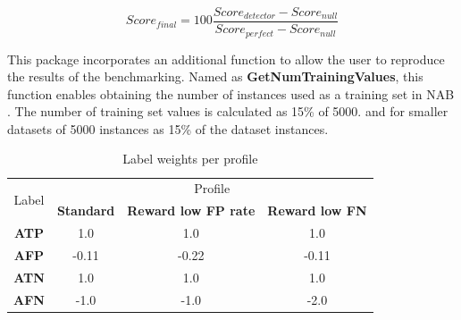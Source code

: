 \documentclass[a4paper]{article}\usepackage[]{graphicx}\usepackage[]{color}
\begin{document}
\begin{equation}\label{eq:eq1}
Score_{final} = 100 \frac{Score_{detector} - Score_{null}}{Score_{perfect} - Score_{null}}
\end{equation}

This package incorporates an additional function to allow the user to reproduce the results of the benchmarking. Named as \textbf{GetNumTrainingValues}, this function enables obtaining the number of instances used as a training set in NAB \cite{7424283}. The number of training set values is calculated as 15\% of 5000. and for smaller datasets of 5000 instances as 15\% of the dataset instances.


\begin{table}[]
\caption{Label weights per profile}
\label{tab:profile}
\centering
\begin{tabular}{cccc}
\hline
\multirow{2}{*}{Label} & \multicolumn{3}{c}{Profile} \\ \cline{2-4}
 & \textbf{Standard} & \textbf{Reward low FP rate} & \textbf{Reward low FN} \\ \hline
\textbf{ATP} & 1.0 & 1.0 & 1.0 \\ \hline
\textbf{AFP} & -0.11 & -0.22 & -0.11 \\ \hline
\textbf{ATN} & 1.0 & 1.0 & 1.0 \\ \hline
\textbf{AFN} & -1.0 & -1.0 & -2.0 \\ \hline
\end{tabular}
\end{table}
\end{document}
